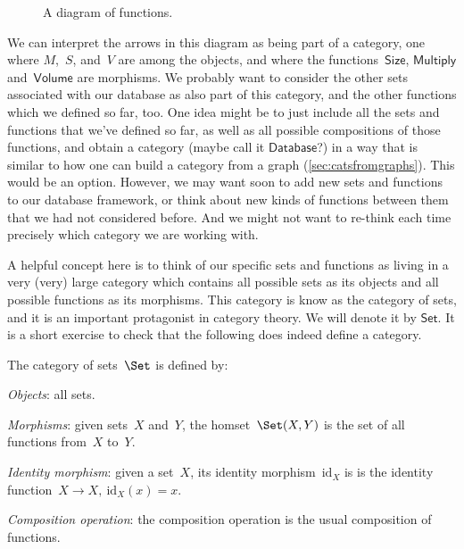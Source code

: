 \begin{figure}[h!]
\begin{center}
\end{center}
\caption{A diagram of functions. \label{fig:diagram_functions}}
\end{figure}

We can interpret the arrows in this diagram as being part of a category, one where $M$,~$S$, and~$V$ are among the objects, and where the functions~$\textsf{Size}$, $\textsf{Multiply}$ and~$\textsf{Volume}$ are morphisms. We probably want to consider the other sets associated with our database as also part of this category, and the other functions which we defined so far, too. One idea might be to just include all the sets and functions that we've defined so far, as well as all possible compositions of those functions, and obtain a category (maybe call it $\textsf{Database}$?) in a way that is similar to how one can build a category from a graph (\cref{sec:catsfromgraphs}). This would be an option. However, we may want soon to add new sets and functions to our database framework, or think about new kinds of functions between them that we had not considered before. And we might not want to re-think each time precisely which category we are working with.

A helpful concept here is to think of our specific sets and functions as living in a very (very) large category which contains all possible sets as its objects and all possible functions as its morphisms. This category is know as the category of sets, and it is an important protagonist in category theory. We will denote it by $\textsf{Set}$. It is a short exercise to check that the following does indeed define a category.

\begin{shaded*}
\begin{definition}
The category of sets~$\Set$ is defined by:
    \begin{compactenum}
    \item \emph{Objects}: all sets.
    \item \emph{Morphisms}: given sets~$X$ and~$Y$, the homset~$\Set(X,Y)$ is the set of all functions from~$X$ to~$Y$.
    \item \emph{Identity morphism}: given a set~$X$, its identity morphism~$\text{id}_X$ is
    is the identity function~$X \to X, \ \text{id}_X(x) = x$.
    \item \emph{Composition operation}: the composition operation is the usual composition of functions.
    \end{compactenum}
\end{definition}
\end{shaded*}

